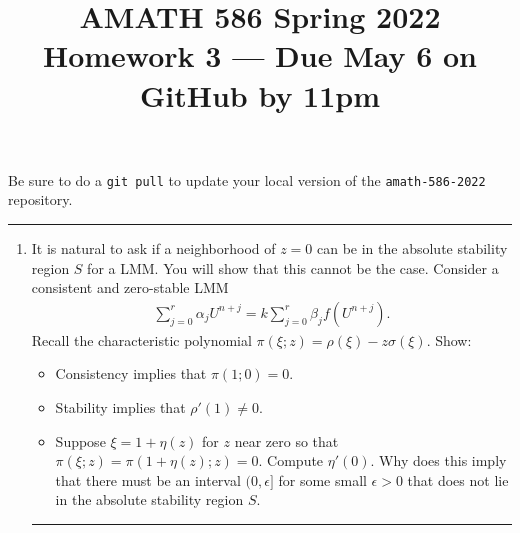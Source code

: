 \documentclass[10pt]{amsart}
\begin{document}
\pagestyle{empty}

\newcommand{\mline}{\vspace{.2in}\hrule\vspace{.2in}}


\title{\bf { AMATH 586 Spring 2022 \\ Homework 3 ---
Due May 6 on GitHub by 11pm} }
\maketitle
\centerline{Be sure to do a {\tt git pull} to update your local version of the {\tt amath-586-2022} repository.}

\mline
\begin{enumerate}[label={\bf Problem~{\arabic*}:}]
\item It is natural to ask if a neighborhood of $z = 0$ can be in the absolute stability region $S$ for a LMM.  You will show that this cannot be the case.  Consider a consistent and zero-stable LMM
  \begin{align*}
    \sum_{j=0}^r \alpha_j U^{n+j} = k \sum_{j=0}^r \beta_j f(U^{n+j}).
  \end{align*}
  Recall the characteristic polynomial $\pi(\xi;z) = \rho(\xi) - z \sigma(\xi)$. Show:
  \begin{itemize}
  \item Consistency implies that $\pi(1;0) = 0$.
  \item Stability implies that $\rho'(1) \neq 0$.
  \item Suppose $\xi = 1 + \eta(z)$ for $z$ near zero so that $\pi(\xi;z) = \pi(1 + \eta(z);z) = 0$.  Compute $\eta'(0)$.  Why does this imply that there must be an interval $(0,\epsilon]$ for some small $\epsilon > 0$ that does not lie in the absolute stability region $S$.  
  \end{itemize}

  \mline
  

\end{enumerate}
\end{document}
